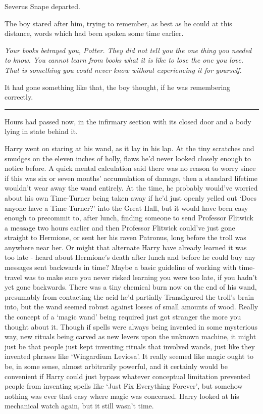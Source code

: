 Severus Snape departed.

The boy stared after him, trying to remember, as best as he could at
this distance, words which had been spoken some time earlier.

\emph{Your books betrayed you, Potter. They did not tell you the one
thing you needed to know. You cannot learn from books what it is like to
lose the one you love. That is something you could never know without
experiencing it for yourself.}

It had gone something like that, the boy thought, if he was remembering
correctly.

\begin{center}\rule{3in}{0.4pt}\end{center}

Hours had passed now, in the infirmary section with its closed door and
a body lying in state behind it.

Harry went on staring at his wand, as it lay in his lap. At the tiny
scratches and smudges on the eleven inches of holly, flaws he'd never
looked closely enough to notice before. A quick mental calculation said
there was no reason to worry since if this was six or seven months'
accumulation of damage, then a standard lifetime wouldn't wear away the
wand entirely. At the time, he probably would've worried about his own
Time-Turner being taken away if he'd just openly yelled out `Does anyone
have a Time-Turner?' into the Great Hall, but it would have been easy
enough to precommit to, after lunch, finding someone to send Professor
Flitwick a message two hours earlier and then Professor Flitwick
could've just gone straight to Hermione, or sent her his raven Patronus,
long before the troll was anywhere near her. Or might that alternate
Harry have already learned it was too late - heard about Hermione's
death after lunch and before he could buy any messages sent backwards in
time? Maybe a basic guideline of working with time-travel was to make
sure you never risked learning you were too late, if you hadn't yet gone
backwards. There was a tiny chemical burn now on the end of his wand,
presumably from contacting the acid he'd partially Transfigured the
troll's brain into, but the wand seemed robust against losses of small
amounts of wood. Really the concept of a `magic wand' being required
just got stranger the more you thought about it. Though if spells were
always being invented in some mysterious way, new rituals being carved
as new levers upon the unknown machine, it might just be that people
just kept inventing rituals that involved wands, just like they invented
phrases like `Wingardium Leviosa'. It really seemed like magic ought to
be, in some sense, almost arbitrarily powerful, and it certainly would
be convenient if Harry could just bypass whatever conceptual limitation
prevented people from inventing spells like `Just Fix Everything
Forever', but somehow nothing was ever that easy where magic was
concerned. Harry looked at his mechanical watch again, but it still
wasn't time.

